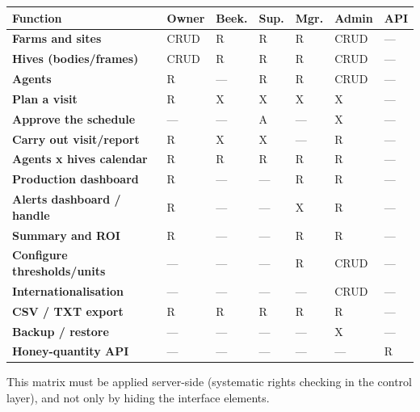 \begin{xltabular}{\textwidth}{>{\bfseries}X C{1.3cm} C{1.3cm} C{1.3cm} C{1.3cm} C{1.3cm} C{1.3cm}}
\toprule
\textbf{Function} & \textbf{Owner} & \textbf{Beek.} & \textbf{Sup.} & \textbf{Mgr.} & \textbf{Admin} & \textbf{API} \\
\midrule
\endhead
Farms and sites          & CRUD & R    & R    & R    & CRUD & --- \\
Hives (bodies/frames)    & CRUD & R    & R    & R    & CRUD & --- \\
Agents                   & R    & ---  & R    & R    & CRUD & --- \\
Plan a visit             & R    & X    & X    & X    & X    & --- \\
Approve the schedule     & ---  & ---  & A    & ---  & X    & --- \\
Carry out visit/report   & R    & X    & X    & ---  & R    & --- \\
Agents x hives calendar  & R    & R    & R    & R    & R    & --- \\
Production dashboard      & R    & ---  & ---  & R    & R    & --- \\
Alerts dashboard / handle & R   & ---  & ---  & X    & R    & --- \\
Summary and ROI          & R    & ---  & ---  & R    & R    & --- \\
Configure thresholds/units & --- & ---  & ---  & R    & CRUD & --- \\
Internationalisation     & ---  & ---  & ---  & ---  & CRUD & --- \\
CSV / TXT export         & R    & R    & R    & R    & R    & --- \\
Backup / restore         & ---  & ---  & ---  & ---  & X    & --- \\
Honey-quantity API       & ---  & ---  & ---  & ---  & ---  & R \\
\bottomrule
\end{xltabular}

\begin{encadre}
This matrix must be applied server-side (systematic rights checking in the
control layer), and not only by hiding the interface elements.
\end{encadre}

